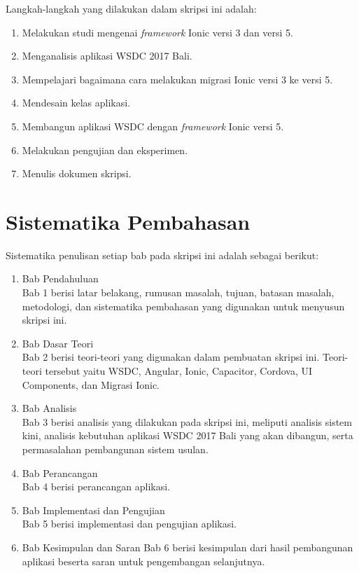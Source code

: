 Langkah-langkah yang dilakukan dalam skripsi ini adalah:

\begin{enumerate}
	\item Melakukan studi mengenai {\it framework} Ionic versi 3 dan versi 5.
	\item Menganalisis aplikasi WSDC 2017 Bali.
	\item Mempelajari bagaimana cara melakukan migrasi Ionic versi 3 ke versi 5.
	\item Mendesain kelas aplikasi.
	\item Membangun aplikasi WSDC dengan {\it framework} Ionic versi 5. 
	\item Melakukan pengujian dan eksperimen.
	\item Menulis dokumen skripsi.
\end{enumerate}


\section{Sistematika Pembahasan}
\label{sec:sispem}

Sistematika penulisan setiap bab pada skripsi ini adalah sebagai berikut:
\begin{enumerate}
	\item Bab Pendahuluan \\
	Bab 1 berisi latar belakang, rumusan masalah, tujuan, batasan masalah, metodologi, dan sistematika pembahasan yang digunakan untuk menyusun skripsi ini.
	\item Bab Dasar Teori \\
	Bab 2 berisi teori-teori yang digunakan dalam pembuatan skripsi ini. Teori-teori tersebut yaitu WSDC, Angular, Ionic, Capacitor, Cordova, UI Components, dan Migrasi Ionic.
	\item Bab Analisis \\
	Bab 3 berisi analisis yang dilakukan pada skripsi ini, meliputi analisis sistem kini, analisis kebutuhan aplikasi WSDC 2017 Bali yang akan dibangun, serta permasalahan pembangunan sistem usulan.
	\item Bab Perancangan \\
	Bab 4 berisi perancangan aplikasi.
	\item Bab Implementasi dan Pengujian \\
	Bab 5 berisi implementasi dan pengujian aplikasi.
	\item Bab Kesimpulan dan Saran
	Bab 6 berisi kesimpulan dari hasil pembangunan aplikasi beserta saran untuk pengembangan selanjutnya.
	\end{enumerate}
